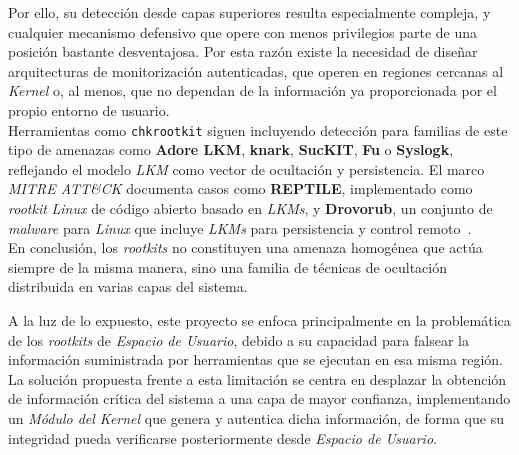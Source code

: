 Por ello, su detección desde capas superiores resulta especialmente compleja, y cualquier mecanismo defensivo que opere con menos privilegios parte de una posición bastante desventajosa.
Por esta razón existe la necesidad de diseñar arquitecturas de monitorización autenticadas, que operen en regiones cercanas al \textit{Kernel} o, al menos, que no dependan de la información ya proporcionada por el propio entorno de usuario.\\

Herramientas como \texttt{chkrootkit} siguen incluyendo detección para familias de este tipo de amenazas como \textbf{Adore LKM}, \textbf{knark}, \textbf{SucKIT}, \textbf{Fu} o \textbf{Syslogk}, reflejando el modelo \textit{LKM} como vector de ocultación y persistencia.
El marco \textit{MITRE ATT\&CK} documenta casos como \textbf{REPTILE}, implementado como \textit{rootkit} \textit{Linux} de código abierto basado en \textit{LKMs}, y \textbf{Drovorub}, un conjunto de \textit{malware} para \textit{Linux} que incluye \textit{LKMs} para persistencia y control remoto~\cite{chkrootkit_man}.\\


En conclusión, los \textit{rootkits} no constituyen una amenaza homogénea que actúa siempre de la misma manera, sino una familia de técnicas de ocultación distribuida en varias capas del sistema.\\

\newpage

A la luz de lo expuesto, este proyecto se enfoca principalmente en la problemática de los \textit{rootkits} de \textit{Espacio de Usuario}, debido a su capacidad para falsear la información suministrada por herramientas que se ejecutan en esa misma región.
La solución propuesta frente a esta limitación se centra en desplazar la obtención de información crítica del sistema a una capa de mayor confianza, implementando un \textit{Módulo del Kernel} que genera y autentica dicha información, de forma que su integridad pueda verificarse posteriormente desde \textit{Espacio de Usuario}.
